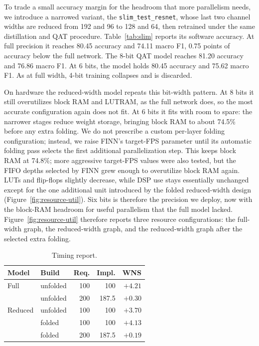 To trade a small accuracy margin for the headroom that more parallelism needs, we
introduce a narrowed variant, the \texttt{slim\_test\_resnet}, whose last two
channel widths are reduced from 192 and 96 to 128 and 64, then retrained under the
same distillation and QAT procedure. Table~\ref{tab:slim} reports its software
accuracy. At full precision it reaches 80.45 accuracy and 74.11 macro F1, 0.75
points of accuracy below the full network. The 8-bit QAT model reaches 81.20
accuracy and 76.86 macro F1. At 6 bits, the model holds 80.45 accuracy and 75.62
macro F1. As at full width, 4-bit training collapses and is discarded.

On hardware the reduced-width model repeats this bit-width pattern. At 8 bits it
still overutilizes block RAM and LUTRAM, as the full network does, so the most
accurate configuration again does not fit. At 6 bits it fits with room to spare: the
narrower stages reduce weight storage, bringing block RAM to about 74.5\% before
any extra folding. We do not prescribe a custom per-layer folding configuration;
instead, we raise FINN's target-FPS parameter until its automatic folding pass
selects the first additional parallelization step. This keeps block RAM at
74.8\%; more aggressive target-FPS values were also tested, but the FIFO depths
selected by FINN grew enough to overutilize block RAM again. LUTs and flip-flops slightly
decrease, while DSP use stays essentially unchanged except for the one additional
unit introduced by the folded reduced-width design
(Figure~\ref{fig:resource-util}). Six bits is therefore the precision we deploy,
now with the block-RAM headroom for useful parallelism that the full model lacked.
Figure~\ref{fig:resource-util} therefore reports three resource configurations:
the full-width graph, the reduced-width graph, and the reduced-width graph after
the selected extra folding.

\begin{table}[H]
\centering
\caption{Timing report.}
\label{tab:timing}
\footnotesize
\begin{tabular}{llrrr}
\toprule
Model & Build & Req. & Impl. & WNS \\
\midrule
Full    & unfolded & 100 & 100   & $+4.21$ \\
        & unfolded & 200 & 187.5 & $+0.30$ \\
\midrule
Reduced & unfolded & 100 & 100   & $+3.70$ \\
        & folded   & 100 & 100   & $+4.13$ \\
        & folded   & 200 & 187.5 & $+0.19$ \\
\bottomrule
\end{tabular}
\end{table}

